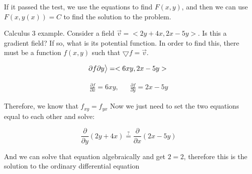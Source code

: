     If it passed the test, we use the equations to find $F(x,y)$, and then we can use $F(x,y(x))=C$ to find the solution to the problem.

    \begin{problem}
      Calculus 3 example. Consider a field $\vec{v}=<2y+4x,2x-5y>$. Is this a gradient field? If so, what is its potential function. In order to find this, there must be a function $f(x,y)$ such that $\bigtriangledown f=\vec{v}$.
    
    
      \begin{equation}
        {\partial f}{\partial y}\big>=<6xy,2x-5y>\\
      \end{equation}
  
      \begin{align}
        \frac{\partial f}{\partial x}=6xy,&& \frac{\partial f}{\partial y}=2x-5y
      \end{align}
  
      Therefore, we know that $f_{xy}=f_{yx}$ Now we just need to set the two equations equal to each other and solve:
  
      \begin{equation}
        \frac{\partial}{\partial y}(2y+4x)\stackrel{?}{=}\frac{\partial}{\partial x}(2x-5y)
      \end{equation}
  
      And we can solve that equation algebraically and get $2=2$, therefore this is the solution to the ordinary differential equation
  
    \end{problem}


